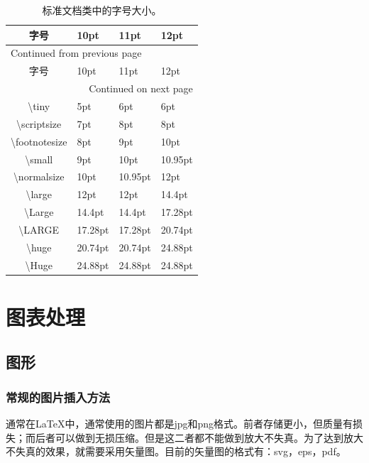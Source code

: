 \documentclass[12pt]{book}
\begin{document}
\begin{longtable}{|c|m{4.5cm}<{\centering}|m{3.5cm}<{\centering}|m{2.5cm}<{\centering}|}
	\caption{\label{absolute-font}标准文档类中的字号大小。}
	\\
	\hline
	字号 & 10pt & 11pt & 12pt\\
	\hline
	\endfirsthead
	\multicolumn{4}{l}{Continued from previous page} \\
	\hline
	
	字号 & 10pt & 11pt & 12pt \\
	
	\hline
	\endhead
	\hline\multicolumn{4}{r}{Continued on next page} \\
	\endfoot
	\endlastfoot
	\hline
	\textbackslash tiny & 5pt & 6pt & 6pt\\
	\hline
	\textbackslash scriptsize & 7pt & 8pt & 8pt\\
	\hline
	\textbackslash footnotesize & 8pt & 9pt & 10pt\\
	\hline
	\textbackslash small & 9pt & 10pt & 10.95pt\\
	\hline
	\textbackslash normalsize & 10pt & 10.95pt & 12pt\\
	\hline
	\textbackslash large & 12pt & 12pt & 14.4pt\\
	\hline
	\textbackslash Large & 14.4pt & 14.4pt & 17.28pt\\
	\hline
	\textbackslash LARGE & 17.28pt & 17.28pt & 20.74pt\\
	\hline
	\textbackslash huge & 20.74pt & 20.74pt & 24.88pt\\
	\hline
	\textbackslash Huge & 24.88pt & 24.88pt & 24.88pt\\
	\hline
\end{longtable}

\chapter{图表处理}

\section{图形}


\subsection{常规的图片插入方法}

通常在\LaTeX{}中，通常使用的图片都是jpg和png格式。前者存储更小，但质量有损失；而后者可以做到无损压缩。但是这二者都不能做到放大不失真。为了达到放大不失真的效果，就需要采用矢量图。目前的矢量图的格式有：svg，eps，pdf。
\end{document}
